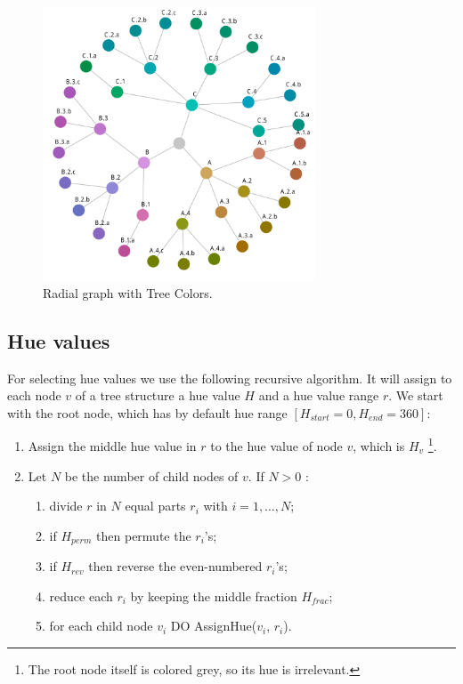 \documentclass[journal]{vgtc}                %
\begin{document}
\begin{figure}[htb]

  \centering
  \includegraphics[width=3.2in]{HCPgraph.pdf}
  \caption{Radial graph with Tree Colors.}\label{fig:graph}

\end{figure}

\subsection{Hue values}

For selecting hue values we use the following recursive algorithm. It will assign to each node $v$ of a tree structure a hue value $H$ and a hue value range $r$.
We start with the root node, which has by default hue range $[H_{start}=0, H_{end}=360]$:

\begin{enumerate} \itemsep1pt \parskip0pt 
\item Assign the middle hue value in $r$ to the hue value of node $v$, which is $H_v$ \footnote{The root node itself is colored grey, so its hue is irrelevant.}.
\item Let $N$ be the number of child nodes of $v$. If $N>0$ :
\begin{enumerate}[i] \itemsep1pt \parskip0pt 
\item divide $r$ in $N$ equal parts $r_i$ with $i=1,\ldots,N$;
\item if $H_{perm}$ then permute the $r_i$'s;
\item if $H_{rev}$ then reverse the even-numbered $r_i$'s;
\item reduce each $r_i$ by keeping the middle fraction $H_{frac}$;
\item for each child node $v_i$ DO AssignHue($v_i$, $r_i$).
\end{enumerate}
\end{enumerate}
\end{document}
